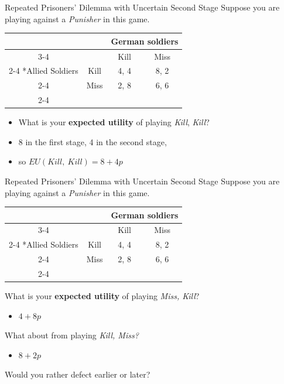 \begin{frame}{Repeated Prisoners' Dilemma with Uncertain Second Stage}
  Suppose you are playing against a \textit{Punisher} in this game. 

  \begin{center}
    \begin{tabular}{*{4}{c|}}
      \multicolumn{2}{c}{} & \multicolumn{2}{c}{German soldiers} \\ \cline{3-4}
      \multicolumn{1}{c}{} &    & Kill & Miss \\ \cline{2-4}
      \multirow{2}*{Allied Soldiers} & Kill & 4, 4 & 8, 2 \\ \cline{2-4}
                         & Miss & 2, 8 & 6, 6 \\ \cline{2-4} 
    \end{tabular} 
  \end{center}

  \begin{itemize}
    \item What is your \textbf{expected utility} of playing \textit{Kill}, \textit{Kill}?
    \pause
    \item 8 in the first stage, 4 in the second stage,
    \item so $EU(Kill,~Kill) = 8 + 4p$
  \end{itemize}
\end{frame}

\begin{frame}{Repeated Prisoners' Dilemma with Uncertain Second Stage}
  Suppose you are playing against a \textit{Punisher} in this game. 

  \begin{center}
    \begin{tabular}{*{4}{c|}}
      \multicolumn{2}{c}{} & \multicolumn{2}{c}{German soldiers} \\ \cline{3-4}
      \multicolumn{1}{c}{} &    & Kill & Miss \\ \cline{2-4}
      \multirow{2}*{Allied Soldiers} & Kill & 4, 4 & 8, 2 \\ \cline{2-4}
                         & Miss & 2, 8 & 6, 6 \\ \cline{2-4} 
    \end{tabular} 
  \end{center}

  What is your \textbf{expected utility} of playing \textit{Miss, Kill}? \\
  \pause
  \begin{itemize}
      \item $4 + 8p$
  \end{itemize}
  What about from playing \textit{Kill, Miss?} \\
  \pause
  \begin{itemize}
      \item $8 + 2p$
  \end{itemize}
  Would you rather defect earlier or later?
\end{frame}

